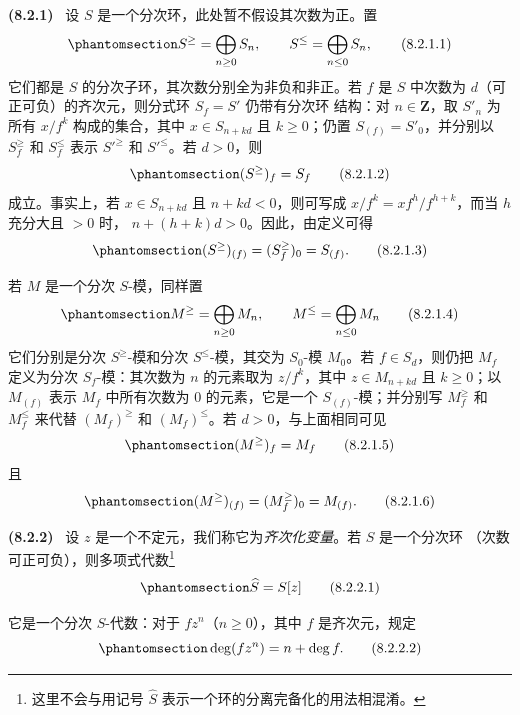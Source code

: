 \documentclass[UTF8,fontset=none,11pt,oneside,openany]{ctexbook}
\newenvironment{env}[1][]{\par\medskip\noindent\textbf{(#1)}\ }{\par}
\newcommand{\oldpage}[2][]{%
  \hypertarget{ega-source-page-#1-#2}{}%
  \marginnote{\scriptsize\textbf{#1}~|~#2}\ignorespaces}
\let\EGAOriginalLabel\label
\renewcommand{\label}[1]{\phantomsection\EGAOriginalLabel{#1}}
\begin{document}
\begin{env}[8.2.1]
\label{II.8.2.1-zh}
设 $S$ 是一个分次环，此处暂不假设其次数为正。置
\begin{equation}
\label{II.8.2.1.1-zh}
  S^{\geq}=\bigoplus_{n\geq0}S_n,
  \qquad
  S^{\leq}=\bigoplus_{n\leq0}S_n,
\tag{8.2.1.1}
\end{equation}
它们都是 $S$ 的分次子环，其次数分别全为非负和非正。若 $f$ 是 $S$
中次数为 $d$（可正可负）的齐次元，则分式环 $S_f=S'$ 仍带有分次环
结构：对 $n\in\mathbf{Z}$，取 $S'_n$ 为所有 $x/f^k$ 构成的集合，其中
$x\in S_{n+kd}$ 且 $k\geq0$；仍置 $S_{(f)}=S'_0$，并分别以
$S_f^{\geq}$ 和 $S_f^{\leq}$ 表示 $S'^{\geq}$ 和 $S'^{\leq}$。若 $d>0$，则
\begin{equation}
\label{II.8.2.1.2-zh}
  (S^{\geq})_f=S_f
\tag{8.2.1.2}
\end{equation}
成立。事实上，若 $x\in S_{n+kd}$ 且 $n+kd<0$，则可写成
$x/f^k=xf^h/f^{h+k}$，而当 $h$ 充分大且 $>0$ 时，
$n+(h+k)d>0$。因此，由定义可得
\begin{equation}
\label{II.8.2.1.3-zh}
  (S^{\geq})_{(f)}=(S_f^{\geq})_0=S_{(f)}.
\tag{8.2.1.3}
\end{equation}

若 $M$ 是一个分次 $S$-模，同样置
\begin{equation}
\label{II.8.2.1.4-zh}
  M^{\geq}=\bigoplus_{n\geq0}M_n,
  \qquad
  M^{\leq}=\bigoplus_{n\leq0}M_n
\tag{8.2.1.4}
\end{equation}
它们分别是分次 $S^{\geq}$-模和分次 $S^{\leq}$-模，其交为 $S_0$-模
$M_0$。若 $f\in S_d$，则仍把 $M_f$ 定义为分次 $S_f$-模：其次数为
$n$ 的元素取为 $z/f^k$，其中 $z\in M_{n+kd}$ 且 $k\geq0$；以
$M_{(f)}$ 表示 $M_f$ 中所有次数为 $0$ 的元素，它是一个
$S_{(f)}$-模；并分别写 $M_f^{\geq}$ 和 $M_f^{\leq}$ 来代替
$(M_f)^{\geq}$ 和 $(M_f)^{\leq}$。若 $d>0$，与上面相同可见
\begin{equation}
\label{II.8.2.1.5-zh}
  (M^{\geq})_f=M_f
\tag{8.2.1.5}
\end{equation}
且
\begin{equation}
\label{II.8.2.1.6-zh}
  (M^{\geq})_{(f)}=(M_f^{\geq})_0=M_{(f)}.
\tag{8.2.1.6}
\end{equation}
\end{env}

\begin{env}[8.2.2]
\label{II.8.2.2-zh}
设 $z$ 是一个不定元，我们称它为\emph{齐次化变量}。若 $S$ 是一个分次环
（次数可正可负），则多项式代数\footnote{这里不会与用记号
$\widehat{S}$ 表示一个环的分离完备化的用法相混淆。}
\begin{equation}
\label{II.8.2.2.1-zh}
  \widehat{S}=S[z]
\tag{8.2.2.1}
\end{equation}

\oldpage[II]{158}
它是一个分次 $S$-代数：对于 $fz^n$（$n\geq0$），其中 $f$ 是齐次元，规定
\begin{equation}
\label{II.8.2.2.2-zh}
  \deg(fz^n)=n+\deg f.
\tag{8.2.2.2}
\end{equation}
\end{env}
\end{document}
